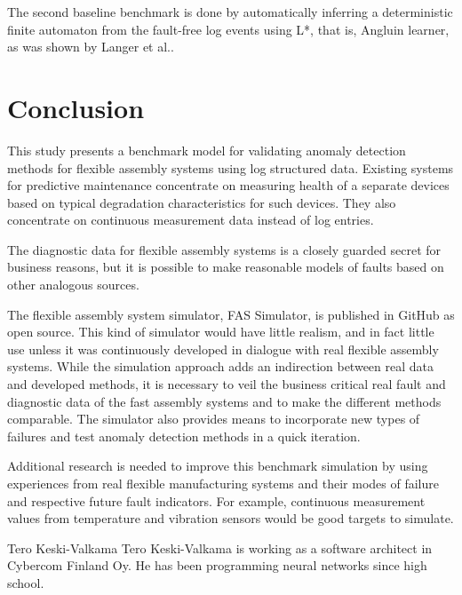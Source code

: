 \documentclass[journal]{IEEEtran}
\begin{document}
The second baseline benchmark is done by automatically inferring a deterministic finite automaton from the fault-free log events using L*, that is, Angluin learner, as was shown
by Langer et al.\cite{langer2011self}.

\section{Conclusion}

This study presents a benchmark model for validating anomaly detection methods for flexible assembly systems using log structured data.
Existing systems for predictive maintenance concentrate on measuring health of a separate devices based on typical degradation characteristics
for such devices. They also concentrate on continuous measurement data instead of log entries.

The diagnostic data for flexible assembly systems is a closely guarded secret for business reasons, but it is possible to make reasonable models
of faults based on other analogous sources.

The flexible assembly system simulator, FAS Simulator, is published in GitHub\cite{FASSimulator} as open source. This kind of simulator would have
little realism, and in fact little use unless it was continuously developed in dialogue with real flexible assembly systems. While the simulation
approach adds an indirection between real data and developed methods, it is necessary to veil the business critical real fault and diagnostic
data of the fast assembly systems and to make the different methods comparable. The simulator also provides means to incorporate new types of
failures and test anomaly detection methods in a quick iteration.

Additional research is needed to improve this benchmark simulation by using experiences from real flexible manufacturing systems and their modes of failure
and respective future fault indicators. For example, continuous measurement values from temperature and vibration sensors would be good targets
to simulate.

\appendices




\begin{IEEEbiography}{Tero Keski-Valkama}
Tero Keski-Valkama is working as a software architect in Cybercom Finland Oy. He has been programming neural networks since high school.
\end{IEEEbiography}
\end{document}
